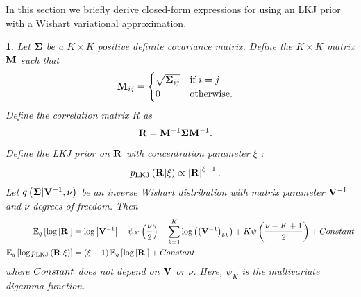 \documentclass{article}\usepackage[]{graphicx}\usepackage[]{color}
\theoremstyle{definition}
\theoremstyle{plain}
\theoremstyle{plain}
\theoremstyle{plain}
\theoremstyle{definition}
\theoremstyle{plain}
\theoremstyle{plain}
\newtheorem{prop}{\protect\propositionname}
\providecommand{\propositionname}{Proposition}
\begin{document}
In this section we briefly derive closed-form expressions for using
an LKJ prior with a Wishart variational approximation.
\begin{prop}
Let $\boldsymbol{\Sigma}$ be a $K\times K$ positive definite covariance matrix.
Define the $K\times K$ matrix $\mathbf{M}$ such that
\begin{align*}
\mathbf{M}_{ij} & =\begin{cases}
\sqrt{\boldsymbol{\Sigma}_{ij}} & \textrm{if }i=j\\
0 & \textrm{otherwise}.
\end{cases}
\end{align*}
Define the correlation matrix $R$ as
\begin{align*}
\mathbf{R} & =\mathbf{M}^{-1}\boldsymbol{\Sigma}\mathbf{M}^{-1}.
\end{align*}
Define the LKJ prior on $\mathbf{R}$ with concentration parameter
$\xi$ \citep{lewandowski:2009:lkj}:
\begin{align*}
p_{\mathrm{LKJ}}\left(\mathbf{R}\vert\xi\right) & \propto\left|\mathbf{R}\right|^{\xi-1}.
\end{align*}
Let $q\left(\boldsymbol{\Sigma}\vert\mathbf{V}^{-1},\nu\right)$ be an inverse
Wishart distribution with matrix parameter $\mathbf{V}^{-1}$ and $\nu$
degrees of freedom. Then
\begin{align*}
\mathbb{E}_{q}\left[\log\left|\mathbf{R}\right|\right] & =\log\left|\mathbf{V}^{-1}\right|-\psi_{K}\left(\frac{\nu}{2}\right)-\sum_{k=1}^{K}\log\left(\left(\mathbf{V}^{-1}\right)_{kk}\right)+K\psi\left(\frac{\nu-K+1}{2}\right)+Constant\\
\mathbb{E}_{q}\left[\log p_{\mathrm{LKJ}}\left(\mathbf{R}\vert\xi\right)\right] & =\left(\xi-1\right)\mathbb{E}_{q}\left[\log\left|\mathbf{R}\right|\right]+Constant,
\end{align*}
where $Constant$ does not depend on $\mathbf{V}$ or $\nu$. Here,
$\psi_{K}$ is the multivariate digamma function.
\end{prop}
\end{document}
